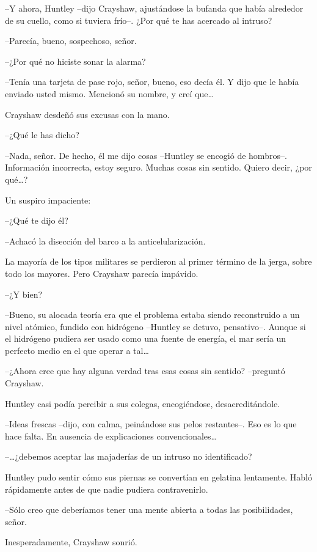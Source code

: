 {--Y ahora, Huntley --dijo Crayshaw, ajustándose la bufanda que había
 alrededor de su cuello, como si tuviera frío--. ¿Por qué te has acercado
al intruso?}

{--Parecía, bueno, sospechoso, señor.}

{--¿Por qué no hiciste sonar la alarma?}

{--Tenía una tarjeta de pase rojo, señor, bueno, eso decía él. Y dijo
 que le había enviado usted mismo. Mencionó su nombre, y creí
 que\ldots{}}

{Crayshaw desdeñó sus excusas con la mano.}

{--¿Qué le has dicho?}

{--Nada, señor. De hecho, él me dijo cosas --Huntley se encogió de
 hombros--. Información incorrecta, estoy seguro. Muchas cosas sin
 sentido. Quiero decir, ¿por qué\ldots{}?}

{Un suspiro impaciente:}

{--¿Qué te dijo él?}

{--Achacó la disección del barco a la anticelularización.}

{La mayoría de los tipos militares se perdieron al primer término de la
jerga, sobre todo los mayores. Pero Crayshaw parecía impávido.}

{--¿Y bien?}

{--Bueno, su alocada teoría era que el problema estaba siendo
 reconstruido a un nivel atómico, fundido con hidrógeno --Huntley se
 detuvo, pensativo--. Aunque si el hidrógeno pudiera ser usado como una
 fuente de energía, el mar sería un perfecto medio en el que operar a
 tal\ldots{}}

{--¿Ahora cree que hay alguna verdad tras esas cosas sin sentido?
--preguntó Crayshaw.}

{Huntley casi podía percibir a sus colegas, encogiéndose,
desacreditándole.}

{--Ideas frescas --dijo, con calma, peinándose sus pelos restantes--.
 Eso es lo que hace falta. En ausencia de explicaciones
 convencionales\ldots{}}

{--\ldots{}¿debemos aceptar las majaderías de un intruso no
identificado?}

{Huntley pudo sentir cómo sus piernas se convertían en gelatina
lentamente. Habló rápidamente antes de que nadie pudiera contravenirlo.}

{--Sólo creo que deberíamos tener una mente abierta a todas las
posibilidades, señor.}

{Inesperadamente, Crayshaw sonrió.}

